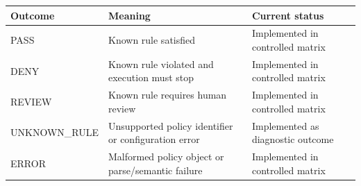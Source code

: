 \begin{tabularx}{\linewidth}{@{}XXX@{}}
\toprule
Outcome & Meaning & Current status \\
\midrule
PASS & Known rule satisfied & Implemented in controlled matrix \\
DENY & Known rule violated and execution must stop & Implemented in controlled matrix \\
REVIEW & Known rule requires human review & Implemented in controlled matrix \\
UNKNOWN\_RULE & Unsupported policy identifier or configuration error & Implemented as diagnostic outcome \\
ERROR & Malformed policy object or parse/semantic failure & Implemented in controlled matrix \\
\bottomrule
\end{tabularx}
